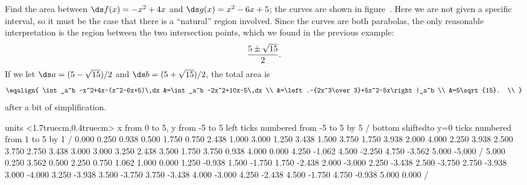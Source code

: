 \begin{example} Find the area between $\ds f(x)= -x^2+4x$ and
$\ds g(x)=x^2-6x+5$; the
curves are shown in figure~. Here we
are not given a specific interval, so it must be the case that there
is a ``natural'' region involved. Since the curves are both parabolas,
the only reasonable interpretation is the region between the two
intersection points, which we found in the previous example:
$${5\pm\sqrt{15}\over2}.$$
If we let $\ds a=(5-\sqrt{15})/2$ and $\ds b=(5+\sqrt{15})/2$,
the total area is 
$$\eqalign{
  \int_a^b -x^2+4x-(x^2-6x+5)\,dx
  &=\int_a^b -2x^2+10x-5\,dx \\
  &=\left.-{2x^3\over3}+5x^2-5x\right|_a^b \\
  &=5\sqrt{15}. \\
}$$
after a bit of simplification.
\end{example}

\figure
\vbox{\beginpicture
\normalgraphs
\ninepoint
\setcoordinatesystem units <1.7truecm,0.4truecm>
\setplotarea x from 0 to 5, y from -5 to 5
\axis left ticks numbered from -5 to 5 by 5 /
\axis bottom shiftedto y=0 ticks numbered from 1 to 5 by 1 /
\setquadratic
{} 0.000 0.250 0.938 0.500 1.750 0.750 2.438 1.000 3.000 
1.250 3.438 1.500 3.750 1.750 3.938 2.000 4.000 2.250 3.938 
2.500 3.750 2.750 3.438 3.000 3.000 3.250 2.438 3.500 1.750 
3.750 0.938 4.000 0.000 4.250 -1.062 4.500 -2.250 4.750 -3.562 
5.000 -5.000 /
 5.000 0.250 3.562 0.500 2.250 0.750 1.062 1.000 0.000 
1.250 -0.938 1.500 -1.750 1.750 -2.438 2.000 -3.000 2.250 -3.438 
2.500 -3.750 2.750 -3.938 3.000 -4.000 3.250 -3.938 3.500 -3.750 
3.750 -3.438 4.000 -3.000 4.250 -2.438 4.500 -1.750 4.750 -0.938 
5.000 0.000 /
\endpicture}

